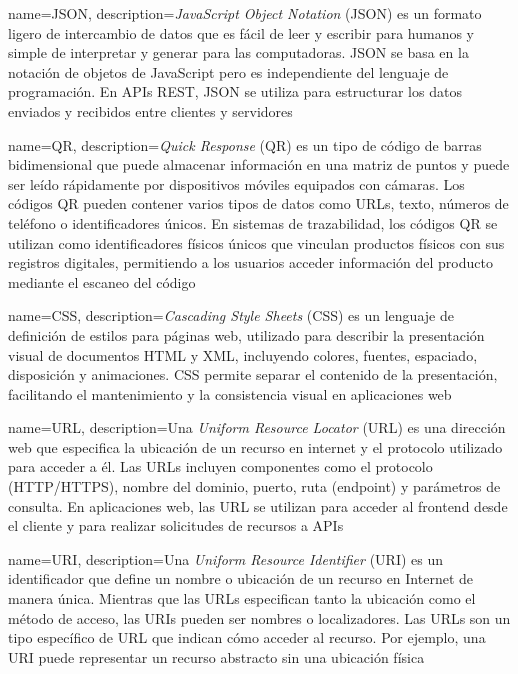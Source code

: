{
    name=JSON,
    description={\textit{JavaScript Object Notation} (JSON) es un formato ligero de intercambio de datos que es fácil de leer y escribir para humanos y simple de interpretar y generar para las computadoras. JSON se basa en la notación de objetos de JavaScript pero es independiente del lenguaje de programación. En APIs REST, JSON se utiliza para estructurar los datos enviados y recibidos entre clientes y servidores}
}

{
    name=QR,
    description={\textit{Quick Response} (QR) es un tipo de código de barras bidimensional que puede almacenar información en una matriz de puntos y puede ser leído rápidamente por dispositivos móviles equipados con cámaras. Los códigos QR pueden contener varios tipos de datos como URLs, texto, números de teléfono o identificadores únicos. En sistemas de trazabilidad, los códigos QR se utilizan como identificadores físicos únicos que vinculan productos físicos con sus registros digitales, permitiendo a los usuarios acceder información del producto mediante el escaneo del código}
}

{
    name=CSS,
    description={\textit{Cascading Style Sheets} (CSS) es un lenguaje de definición de estilos para páginas web, utilizado para describir la presentación visual de documentos HTML y XML, incluyendo colores, fuentes, espaciado, disposición y animaciones. CSS permite separar el contenido de la presentación, facilitando el mantenimiento y la consistencia visual en aplicaciones web}
}

{
    name=URL,
    description={Una \textit{Uniform Resource Locator} (URL) es una dirección web que especifica la ubicación de un recurso en internet y el protocolo utilizado para acceder a él. Las URLs incluyen componentes como el protocolo (HTTP/HTTPS), nombre del dominio, puerto, ruta (endpoint) y parámetros de consulta. En aplicaciones web, las URL se utilizan para acceder al frontend desde el cliente y para realizar solicitudes de recursos a APIs}
}

{
    name=URI,
    description={Una \textit{Uniform Resource Identifier} (URI) es un identificador que define un nombre o ubicación de un recurso en Internet de manera única. Mientras que las URLs especifican tanto la ubicación como el método de acceso, las URIs pueden ser nombres o localizadores. Las URLs son un tipo específico de URL que indican cómo acceder al recurso. Por ejemplo, una URI puede representar un recurso abstracto sin una ubicación física}
}

